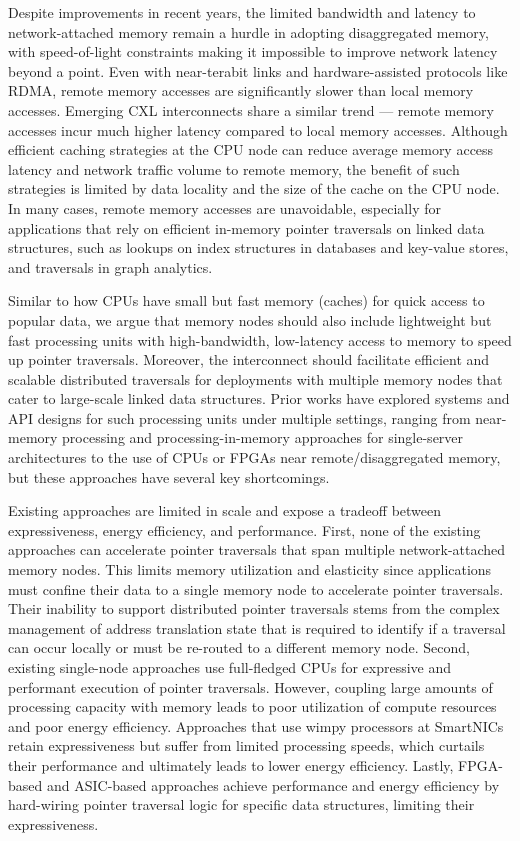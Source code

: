 Despite improvements in recent years, the limited bandwidth and latency to network-attached memory remain a hurdle in adopting disaggregated memory, with speed-of-light constraints making it impossible to improve network latency beyond a point. Even with near-terabit links and hardware-assisted protocols like RDMA, remote memory accesses are significantly slower than local memory accesses. Emerging CXL interconnects share a similar trend — remote memory accesses incur much higher latency compared to local memory accesses. Although efficient caching strategies at the CPU node can reduce average memory access latency and network traffic volume to remote memory, the benefit of such strategies is limited by data locality and the size of the cache on the CPU node. In many cases, remote memory accesses are unavoidable, especially for applications that rely on efficient in-memory pointer traversals on linked data structures, such as lookups on index structures in databases and key-value stores, and traversals in graph analytics.

Similar to how CPUs have small but fast memory (caches) for quick access to popular data, we argue that memory nodes should also include lightweight but fast processing units with high-bandwidth, low-latency access to memory to speed up pointer traversals. Moreover, the interconnect should facilitate efficient and scalable distributed traversals for deployments with multiple memory nodes that cater to large-scale linked data structures. Prior works have explored systems and API designs for such processing units under multiple settings, ranging from near-memory processing and processing-in-memory approaches for single-server architectures to the use of CPUs or FPGAs near remote/disaggregated memory, but these approaches have several key shortcomings.

Existing approaches are limited in scale and expose a tradeoff between expressiveness, energy efficiency, and performance. First, none of the existing approaches can accelerate pointer traversals that span multiple network-attached memory nodes. This limits memory utilization and elasticity since applications must confine their data to a single memory node to accelerate pointer traversals. Their inability to support distributed pointer traversals stems from the complex management of address translation state that is required to identify if a traversal can occur locally or must be re-routed to a different memory node. Second, existing single-node approaches use full-fledged CPUs for expressive and performant execution of pointer traversals. However, coupling large amounts of processing capacity with memory leads to poor utilization of compute resources and poor energy efficiency. Approaches that use wimpy processors at SmartNICs retain expressiveness but suffer from limited processing speeds, which curtails their performance and ultimately leads to lower energy efficiency. Lastly, FPGA-based and ASIC-based approaches achieve performance and energy efficiency by hard-wiring pointer traversal logic for specific data structures, limiting their expressiveness.

